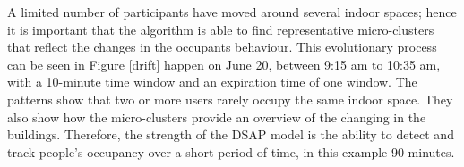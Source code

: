 
A limited number of participants have moved around several indoor spaces; hence it is important that the algorithm is able to find representative micro-clusters that reflect the changes in the occupants behaviour. This evolutionary process can be seen in Figure \ref{drift} happen on June 20, between 9:15 am to 10:35 am, with a 10-minute time window and an expiration time of one window. The patterns show that two or more users rarely occupy the same indoor space. They also show how the micro-clusters provide an overview of the changing in the buildings. Therefore, the strength of the DSAP model is the ability to detect and track people's occupancy over a short period of time, in this example 90 minutes.



